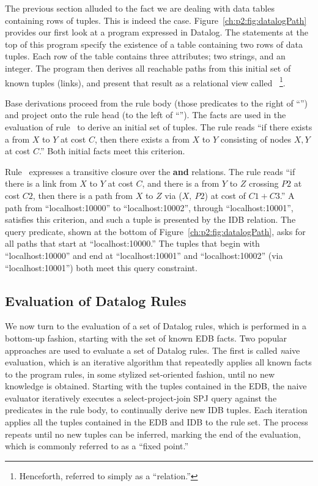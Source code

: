 The previous section alluded to the fact we are dealing with data tables
containing rows of tuples.  This is indeed the case.
Figure~\ref{ch:p2:fig:datalogPath} provides our first look at a program
expressed in Datalog.  The statements at the top of this program specify the
existence of a  table containing two rows of data tuples.  Each row of
the  table contains three attributes; two strings, and an integer.
The program then derives all reachable paths from this initial set of known
tuples (links), and present that result as a relational view called 
~\footnote{Henceforth, referred to simply as a ``relation.''}.

Base derivations proceed from the rule body (those predicates to the right of
``\ol{:-}'') and project onto the rule head (to the left of ``\ol{:-}'').  The
 facts are used in the evaluation of rule~ to derive an initial
set of  tuples.  The rule reads ``if there exists a  from $X$
to $Y$ at cost $C$, then there exists a  from $X$ to $Y$ consisting of
nodes $X, Y$ at cost $C$.'' Both initial facts meet this criterion.

Rule~ expresses a transitive closure over the  {\bf and}
 relations.  The rule reads ``if there is a link from $X$ to $Y$ at
cost $C$, and there is a  from $Y$ to $Z$ crossing $P2$ at cost $C2$,
then there is a path from $X$ to $Z$ via ($X,\ P2$) at cost of $C1+C3$.'' A
path from ``localhost:10000'' to ``localhost:10002'', through
``localhost:10001'', satisfies this criterion, and such a tuple is presented by
the  IDB relation.  The query predicate, shown at the bottom of
Figure~\ref{ch:p2:fig:datalogPath}, asks for all paths that start at
``localhost:10000.'' The  tuples that begin with ``localhost:10000''
and end at ``localhost:10001'' and ``localhost:10002'' (via
``localhost:10001'') both meet this query constraint.

\subsection{Evaluation of Datalog Rules}

We now turn to the evaluation of a set of Datalog rules, which is performed in
a bottom-up fashion, starting with the set of known EDB facts.  Two popular
approaches are used to evaluate a set of Datalog rules.  The first is called
{\emph naive evaluation}, which is an iterative algorithm that repeatedly
applies all known facts to the program rules, in some stylized set-oriented
fashion, until no new knowledge is obtained.  Starting with the tuples
contained in the EDB, the naive evaluator iteratively executes a
select-project-join SPJ query against the predicates in the rule body, to
continually derive new IDB tuples.  Each iteration applies all the tuples
contained in the EDB and IDB to the rule set.  The process repeats until no new
tuples can be inferred, marking the end of the evaluation, which is commonly
referred to as a ``fixed point.''

